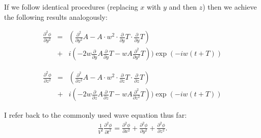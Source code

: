 \documentclass{mm2}
\begin{document}
\begin{answer}{2}
If we follow identical procedures (replacing $x$ with $y$ and then $z$) then we achieve the following results analogously:

\begin{eqnarray}
\frac{\partial ^2 \phi}{\partial y^2} &=& (\frac{\partial^2}{\partial y^2} A - A \cdot w^2 \cdot \frac{\partial }{\partial y}T \cdot \frac{\partial}{\partial y}T)\\ &+& i (-2w\frac{\partial }{\partial y}A\frac{\partial}{\partial y}T-wA\frac{\partial^2}{\partial y^2}T))\exp(-iw(t + T))
\end{eqnarray}

\begin{eqnarray}
\frac{\partial ^2 \phi}{\partial z^2} &=& (\frac{\partial^2}{\partial z^2} A - A \cdot w^2 \cdot \frac{\partial }{\partial z}T \cdot \frac{\partial}{\partial z}T)\\ &+& i (-2w\frac{\partial }{\partial z}A\frac{\partial}{\partial z}T-wA\frac{\partial^2}{\partial z^2}T))\exp(-iw(t + T))
\end{eqnarray}

I refer back to the commonly used wave equation thus far:
\begin{eqnarray}
\frac{1}{V^2}\frac{\partial^2 \phi}{\partial t^2}=\frac{\partial^2 \phi}{\partial x^2}+\frac{\partial^2 \phi}{\partial y^2}+
\frac{\partial^2 \phi}{\partial z^2}.
\label{eq_wave}
\end{eqnarray}


\end{answer}
\end{document}
